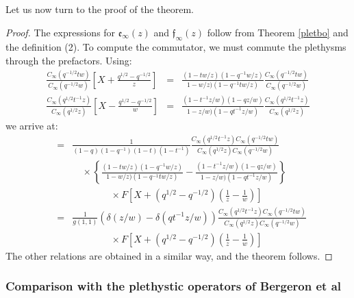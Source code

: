 Let us now turn to the proof of the theorem.
\begin{proof}
The expressions for ${\mathfrak e}_\infty(z)$ and ${\mathfrak f}_\infty(z)$ follow from Theorem \ref{pletbo}
and the definition (2). To compute the commutator, we must commute the plethysms through the prefactors.
Using:
\begin{eqnarray*}
\frac{C_\infty(q^{-1/2}t w)}{C_\infty(q^{-1/2}w)}\left[ X+\frac{q^{1/2}-q^{-1/2}}{z}\right]&=&
\frac{(1-tw/z)(1-q^{-1}w/z)}{1-w/z)(1-q^{-1}tw/z)}\frac{C_\infty(q^{-1/2}t w)}{C_\infty(q^{-1/2}w)}\\
\frac{C_\infty(q^{1/2}t^{-1}z)}{C_\infty(q^{1/2}z)}\left[ X-\frac{q^{1/2}-q^{-1/2}}{w}\right]&=&
\frac{(1-t^{-1}z/w)(1-qz/w)}{1-z/w)(1-qt^{-1}z/w)}\frac{C_\infty(q^{1/2}t^{-1}z)}{C_\infty(q^{1/2}z)}
\end{eqnarray*}
we arrive at:
\begin{eqnarray*}
[{\mathfrak e}_\infty(z),{\mathfrak f}_\infty(w)]&=& \frac{1}{(1-q)(1-q^{-1})(1-t)(1-t^{-1})}\frac{C_\infty(q^{1/2}t^{-1}z)C_\infty(q^{-1/2}t w)}{C_\infty(q^{1/2}z)C_\infty(q^{-1/2}w)}\\
&&\quad \times \left\{ \frac{(1-tw/z)(1-q^{-1}w/z)}{1-w/z)(1-q^{-1}tw/z)}-\frac{(1-t^{-1}z/w)(1-qz/w)}{1-z/w)(1-qt^{-1}z/w)}\right\}\\
&&\qquad \qquad \times F\left[ X+(q^{1/2}-q^{-1/2})(\frac{1}{z}-\frac{1}{w})\right]\\
&=&\frac{1}{g(1,1)} (\delta(z/w)-\delta(qt^{-1}z/w) )\frac{C_\infty(q^{1/2}t^{-1}z)C_\infty(q^{-1/2}t w)}{C_\infty(q^{1/2}z)C_\infty(q^{-1/2}w)}\\
&&\qquad \qquad \times F\left[ X+(q^{1/2}-q^{-1/2})(\frac{1}{z}-\frac{1}{w})\right]
\end{eqnarray*}
The other relations are obtained in a similar way,
and the theorem follows.
\end{proof}
\subsubsection{Comparison with the plethystic operators of Bergeron et al \cite{BGLX}}

